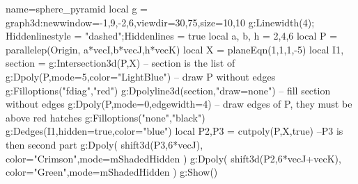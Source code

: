 \documentclass[12pt]{standalone}
\begin{document}
   
\begin{luadraw}{name=sphere_pyramid}
local g = graph3d:new{window={-1,9,-2,6},viewdir={30,75},size={10,10}}
g:Linewidth(4); Hiddenlinestyle = "dashed";Hiddenlines = true
local a, b, h = 2,4,6
local P = parallelep(Origin, a*vecI,b*vecJ,h*vecK)
local X = planeEqn(1,1,1,-5)
local I1, section = g:Intersection3d(P,X) -- section is the list of 
g:Dpoly(P,{mode=5,color="LightBlue"})  -- draw P without edges
g:Filloptions("fdiag","red")
g:Dpolyline3d(section,"draw=none") -- fill section without edges
g:Dpoly(P,{mode=0,edgewidth=4})  -- draw edges of P, they must be above red hatches
g:Filloptions("none","black")
g:Dedges(I1,{hidden=true,color="blue"})
local P2,P3 = cutpoly(P,X,true) --P3 is then second part
g:Dpoly( shift3d(P3,6*vecJ), {color="Crimson",mode=mShadedHidden} )
g:Dpoly( shift3d(P2,6*vecJ+vecK), {color="Green",mode=mShadedHidden} )
g:Show()
\end{luadraw}
\end{document}
